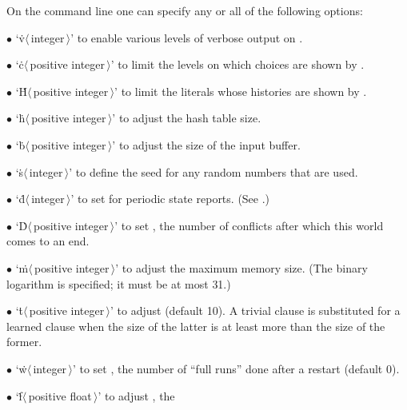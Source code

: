 On the command line one can specify any or all of the following options:
\smallskip
\item{$\bullet$}
`\.v$\langle\,$integer$\,\rangle$' to enable various levels of verbose
output on .
\item{$\bullet$}
`\.c$\langle\,$positive integer$\,\rangle$' to limit the levels on which
choices are shown by .
\item{$\bullet$}
`\.H$\langle\,$positive integer$\,\rangle$' to limit the literals whose
histories are shown by .
\item{$\bullet$}
`\.h$\langle\,$positive integer$\,\rangle$' to adjust the hash table size.
\item{$\bullet$}
`\.b$\langle\,$positive integer$\,\rangle$' to adjust the size of the input
buffer.
\item{$\bullet$}
`\.s$\langle\,$integer$\,\rangle$' to define the seed for any random numbers
that are used.
\item{$\bullet$}
`\.d$\langle\,$integer$\,\rangle$' to set  for periodic state
reports.
(See .)
\item{$\bullet$}
`\.D$\langle\,$positive integer$\,\rangle$' to set , the
number of conflicts after which this world comes to an end.
\item{$\bullet$}
`\.m$\langle\,$positive integer$\,\rangle$' to adjust the maximum memory size.
(The binary logarithm is specified; it must be at most 31.)
\item{$\bullet$}
`\.t$\langle\,$positive integer$\,\rangle$' to adjust 
(default
10). A trivial clause is substituted for a learned clause when the size of the
latter is at least  more than the size of the former.
\item{$\bullet$}
`\.w$\langle\,$integer$\,\rangle$' to set , the number of
``full runs''
done after a restart (default 0).
\item{$\bullet$}
`\.f$\langle\,$positive float$\,\rangle$' to adjust , the
